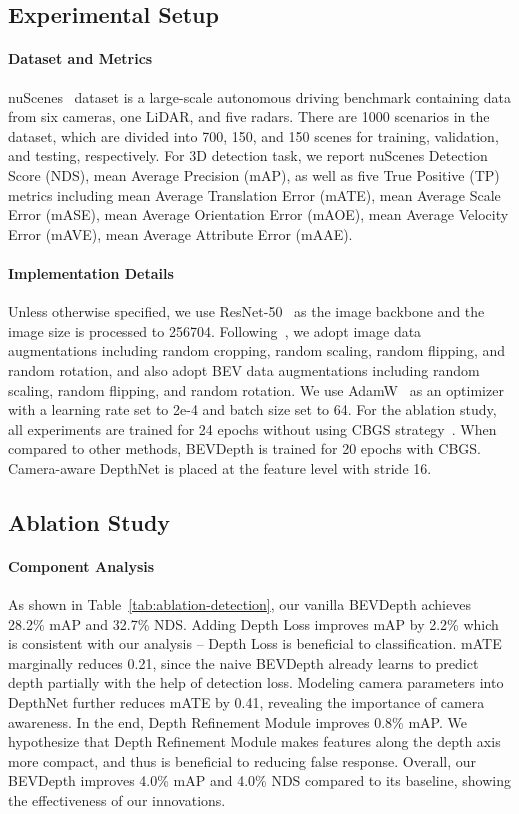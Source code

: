 \documentclass[twocolumn,letterpaper]{article}
\begin{document}
\subsection{Experimental Setup}

\paragraph{Dataset and Metrics} nuScenes~\cite{caesar2020nuscenes} dataset is a large-scale autonomous driving benchmark containing data from six cameras, one LiDAR, and five radars. There are 1000 scenarios in the dataset, which are divided into 700, 150, and 150 scenes for training, validation, and testing, respectively. For 3D detection task, we report nuScenes Detection Score (NDS), mean Average Precision (mAP), as well as five True Positive (TP) metrics including mean Average Translation Error (mATE), mean Average Scale Error (mASE), mean Average Orientation Error (mAOE), mean Average Velocity Error (mAVE), mean Average Attribute Error (mAAE).

\paragraph{Implementation Details} Unless otherwise specified, we use ResNet-50~\cite{resnet} as the image backbone and the image size is processed to 256704. Following~\cite{huang2021bevdet}, we adopt image data augmentations including random cropping, random scaling, random flipping, and random rotation, and also adopt BEV data augmentations including random scaling, random flipping, and random rotation. We use AdamW~\cite{adamw} as an optimizer with a learning rate set to 2e-4 and batch size set to 64. For the ablation study, all experiments are trained for 24 epochs without using CBGS strategy~\cite{zhu2019class}. When compared to other methods, BEVDepth is trained for 20 epochs with CBGS. Camera-aware DepthNet is placed at the feature level with stride 16.

\subsection{Ablation Study}\label{sec:4.2}

\paragraph{Component Analysis} As shown in Table~\ref{tab:ablation-detection}, our vanilla BEVDepth achieves 28.2\% mAP and 32.7\% NDS. Adding Depth Loss improves mAP by 2.2\% which is consistent with our analysis -- Depth Loss is beneficial to classification. mATE marginally reduces 0.21, since the naive BEVDepth already learns to predict depth partially with the help of detection loss. Modeling camera parameters into DepthNet further reduces mATE by 0.41, revealing the importance of camera awareness. In the end, Depth Refinement Module improves 0.8\% mAP. We hypothesize that Depth Refinement Module makes features along the depth axis more compact, and thus is beneficial to reducing false response. Overall, our BEVDepth improves 4.0\% mAP and 4.0\% NDS compared to its baseline, showing the effectiveness of our innovations.
\end{document}
